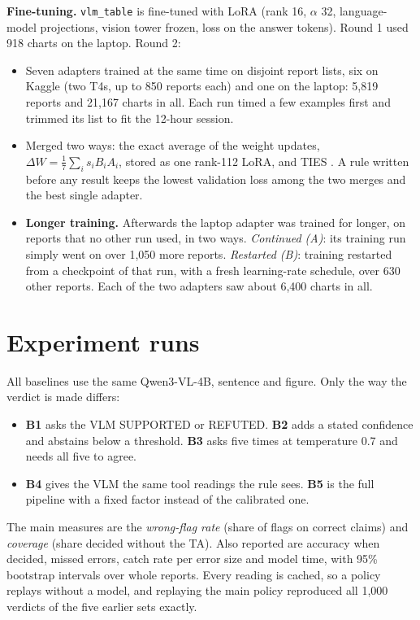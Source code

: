 \documentclass[11pt,a4paper]{article}
\newcommand{\code}[1]{\texttt{\small #1}}
\begin{document}
\textbf{Fine-tuning.}\label{sec:ft} \code{vlm\_table} is fine-tuned with LoRA \cite{lora} (rank 16, $\alpha$ 32, language-model projections, vision tower frozen, loss on the answer tokens). Round 1 used 918 charts on the laptop. Round 2:
\begin{itemize}
\item Seven adapters trained at the same time on disjoint report lists, six on Kaggle (two T4s, up to 850 reports each) and one on the laptop: 5{,}819 reports and 21{,}167 charts in all. Each run timed a few examples first and trimmed its list to fit the 12-hour session.
\item Merged two ways: the exact average of the weight updates, $\Delta W = \tfrac{1}{7}\sum_i s_i B_i A_i$, stored as one rank-112 LoRA, and TIES \cite{ties}. A rule written before any result keeps the lowest validation loss among the two merges and the best single adapter.
\item \textbf{Longer training.} Afterwards the laptop adapter was trained for longer, on reports that no other run used, in two ways. \emph{Continued (A)}: its training run simply went on over 1{,}050 more reports. \emph{Restarted (B)}: training restarted from a checkpoint of that run, with a fresh learning-rate schedule, over 630 other reports. Each of the two adapters saw about 6{,}400 charts in all.
\end{itemize}

\section{Experiment runs}\label{sec:runs}

All baselines use the same Qwen3-VL-4B, sentence and figure. Only the way the verdict is made differs:
\begin{itemize}
\item \textbf{B1} asks the VLM SUPPORTED or REFUTED. \textbf{B2} adds a stated confidence and abstains below a threshold. \textbf{B3} asks five times at temperature 0.7 and needs all five to agree.
\item \textbf{B4} gives the VLM the same tool readings the rule sees. \textbf{B5} is the full pipeline with a fixed factor instead of the calibrated one.
\end{itemize}
The main measures are the \emph{wrong-flag rate} (share of flags on correct claims) and \emph{coverage} (share decided without the TA). Also reported are accuracy when decided, missed errors, catch rate per error size and model time, with 95\% bootstrap intervals over whole reports. Every reading is cached, so a policy replays without a model, and replaying the main policy reproduced all 1{,}000 verdicts of the five earlier sets exactly.
\end{document}

